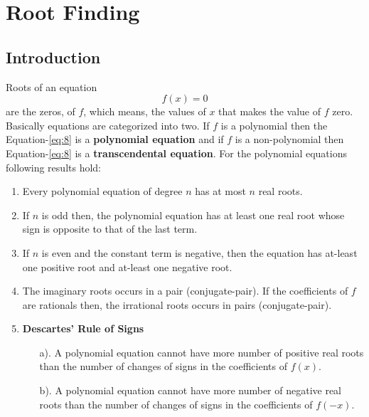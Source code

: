 \documentclass[aima203_lecturenotes_ku.tex]{subfiles}
\begin{document}
\chapter{Root Finding}
\section{Introduction}
Roots of an equation
\begin{equation}
  \label{eq:8}
f(x) = 0
\end{equation}
are the zeros, of \(f\), which means, the values of \(x\) that makes the value of \(f\) zero. Basically equations are categorized into two. If \(f\) is a polynomial then the Equation-\ref{eq:8} is a \textbf{polynomial equation} and if \(f\) is a non-polynomial then Equation-\ref{eq:8} is a \textbf{transcendental equation}. For the polynomial equations following results hold:
\begin{enumerate}
\item Every polynomial equation of degree \(n\) has at most \(n\) real roots.
\item If \(n\) is odd then, the polynomial equation has at least one real root whose sign is opposite to that of the last term.
\item If \(n\) is even and the constant term is negative, then the equation has at-least one positive root and at-least one negative root.
\item The imaginary roots occurs in a pair (conjugate-pair). If the coefficients of \(f\) are rationals then, the irrational roots occurs in pairs (conjugate-pair).

\item \textbf{Descartes' Rule of Signs}
  \begin{enumerate}
  \item[a).] A polynomial equation cannot have more number of positive real roots than the number of changes of signs in the coefficients of \(f(x)\).
  \item[b).] A polynomial equation cannot have more number of negative real roots than the number of changes of signs in the coefficients of \(f(-x)\).
  \end{enumerate}
\end{enumerate}
\end{document}
